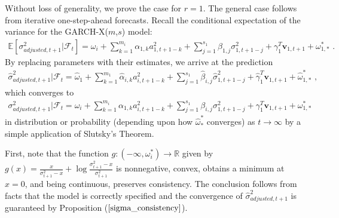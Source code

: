 \documentclass[11pt,3p,review,authoryear]{elsarticle}
\newcommand{\x}{\textbf{v}}
\def\E{\mathbb{E}} %
\theoremstyle{definition}
\newenvironment{proof-of-proposition}[1][{}]{\noindent{\bf
    Proof of Proposition {#1}}
  \hspace*{.5em}}{\qed\bigskip\\}
\begin{document}
    \begin{proof-of-proposition}[\ref{sigma_consistency}]
      Without loss of generality, we prove the case for $r = 1$.  The general case follows from iterative one-step-ahead forecasts.  Recall the conditional expectation of the variance for the GARCH-X($m$,$s$) model:
      \begin{align*}
      \E[\sigma^{2}_{adjusted,t+1}|\mathcal{F}_{t}] = \omega_{i} +  \sum^{m_{i}}_{k=1}\alpha_{1,k}a^{2}_{1,t+1-k} + \sum_{j=1}^{s_{1}}\beta_{1,j}\sigma_{1,t+1-j}^{2} + \gamma_{1}^{T} \x_{1,t+1} + \omega^{*}_{1,*} \text{ .}
      \end{align*}
      By replacing parameters with their estimates, we arrive at the prediction 
      \begin{align*}
      \hat\sigma^{2}_{adjusted,t+1}|\mathcal{F}_{t} = \hat\omega_{1} + \sum^{m_{1}}_{k=1}\hat\alpha_{i,k}a^{2}_{i,t+1-k} + \sum_{j=1}^{s_{1}}\hat\beta_{i,j}\hat\sigma_{1,t+1-j}^{2} + \hat\gamma_{1}^{T} \x_{1,t+1} + \hat\omega^{*}_{1,*}\text { ,}
      \end{align*}
      which converges to 
      \begin{align*}
        \sigma^{2}_{adjusted,t+1}|\mathcal{F}_{t} = \omega_{i} + \sum^{m_{i}}_{k=1}\alpha_{1,k}a^{2}_{i,t+1-k} + \sum_{j=1}^{s_{1}}\beta_{i,j}\sigma_{1,t+1-j}^{2} + \gamma_{1}^{T} \x_{1,t+1} + \omega^{*}_{1,*}
        \end{align*}
      in distribution or probability (depending upon how $\hat\omega^{*}_{*}$ converges) as $t\rightarrow\infty$ by a simple application of Slutsky's Theorem.
      \end{proof-of-proposition}

  \begin{proof-of-proposition}[\ref{asymptotic_consistency}]
    First, note that the function $g:(-\infty,\omega_{i}^{*})\rightarrow \mathbb{R}$ given by $g(x) = \frac{x}{\sigma^{2}_{t+1}-x} + \log{\frac{\sigma_{t+1}^{2}-x}{\sigma_{t+1}^{2}} }$ is nonnegative, convex, obtains a minimum at $x = 0$, and being continuous, preserves consistency. The conclusion follows from facts that the model is correctly specified and the convergence of $\hat\sigma^{2}_{adjusted,t+1}$ is guaranteed by Proposition ($\ref{sigma_consistency}$). 
  \end{proof-of-proposition}
  
\clearpage


\end{document}
